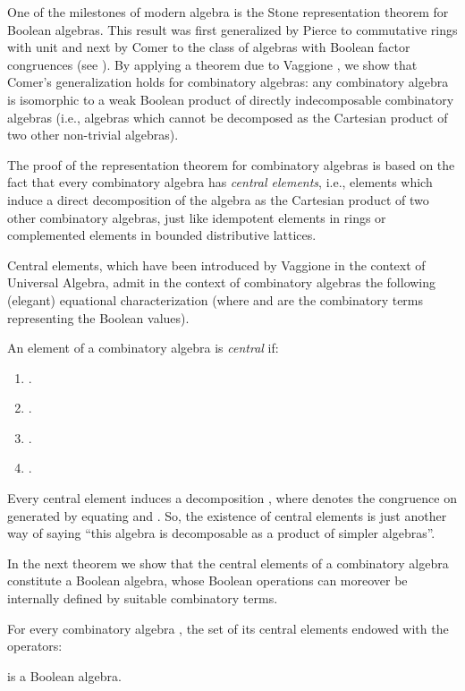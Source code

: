 \documentclass[english]{llncs}
\begin{document}
One of the milestones of modern algebra is the Stone representation theorem for Boolean algebras.
This result was first generalized by Pierce to commutative rings with unit and next by Comer to the class of algebras with Boolean factor 
congruences (see \cite{Comer71,Johnstone82,Pierce67}). 
By applying a theorem due to Vaggione \cite{Vaggione96b}, we show that Comer's generalization holds for combinatory algebras: 
any combinatory algebra is isomorphic to a weak Boolean product of directly indecomposable combinatory algebras 
(i.e., algebras which cannot be decomposed as the Cartesian product of two other non-trivial algebras). 

The proof of the representation theorem for combinatory algebras is based on the fact that every combinatory algebra has 
{\em central elements}, i.e., elements which induce a direct decomposition of the algebra as the Cartesian product of two 
other combinatory algebras, just like idempotent elements in rings or complemented elements in bounded distributive lattices.

Central elements, which have been introduced by Vaggione \cite{Vaggione96a} in the context of Universal Algebra, admit in the 
context of combinatory algebras the following (elegant) equational characterization (where  and 
 are the combinatory terms representing the Boolean values).

\begin{definition} An element  of a combinatory algebra  is {\em central} if:
\begin{enumerate}
\item[] .
\item[] .
\item[] .
\item[] .
\end{enumerate}
\end{definition}

Every central element  induces a decomposition , where 
 denotes the congruence on  generated by equating  and .
So, the existence of central elements is just another way of saying ``this algebra is decomposable as a product of simpler algebras''.

In the next theorem we show that the central elements of a combinatory algebra constitute a Boolean algebra, whose Boolean operations
can moreover be internally defined by suitable combinatory terms. 

\begin{theorem} \cite[Thm.~4.3.6]{ManzonettoTh} For every combinatory algebra , the set  of its central elements endowed with the operators:

is a Boolean algebra. 
\end{theorem}
\end{document}
